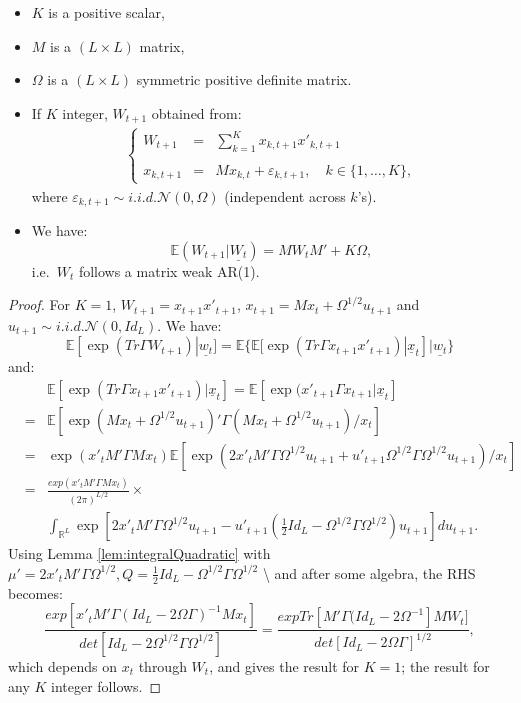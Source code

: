 \documentclass[
  12pt,
]{book}
\theoremstyle{definition}
\theoremstyle{definition}
\theoremstyle{definition}
\theoremstyle{definition}
\theoremstyle{remark}
\begin{document}
\begin{itemize}
\item
  \(K\) is a positive scalar,
\item
  \(M\) is a \((L \times L)\) matrix,
\item
  \(\Omega\) is a \((L \times L)\) symmetric positive definite matrix.
\item
  If \(K\) integer, \(W_{t+1}\) obtained from:
  \begin{eqnarray*}
  \left\{
  \begin{array}{ccl}
  W_{t+1} & =&  \sum^K_{k=1} x_{k,t+1} x'_{k,t+1}\\
  &&\\
  x_{k,t+1} & =& M x_{k,t} + \varepsilon_{k,t+1},\quad k \in \{1,\dots,K\},
  \end{array}
  \right.
  \end{eqnarray*}
  where \(\varepsilon_{k,t+1} \sim i.i.d. \mathcal{N}(0, \Omega)\) (independent across \(k\)'s).
\item
  We have:
  \[
  \mathbb{E}(W_{t+1}|\underline{W_t}) = MW_tM'+K \Omega,
  \]
  i.e.~\(W_t\) follows a matrix weak AR(1).
\end{itemize}

\begin{proof}
For \(K=1\), \(W_{t+1}=x_{t+1} x'_{t+1}\), \(x_{t+1} = M x_t + \Omega^{1/2} u_{t+1}\) and \(u_{t+1} \sim i.i.d. \mathcal{N}(0,Id_L)\). We have:
\[
\mathbb{E}[\exp(Tr \Gamma W_{t+1})|\underline{w_t}] = \mathbb{E}\{\mathbb{E}[\exp(Tr \Gamma x_{t+1} x'_{t+1})|\underline{x}_t]|\underline{w_t}\}
\]
and:
\begin{eqnarray*}
&& \mathbb{E}[\exp(Tr \Gamma x_{t+1}x'_{t+1})|\underline{x}_t] = \mathbb{E}[\exp(x'_{t+1}\Gamma x_{t+1}|\underline{x}_t] \\
&=& \mathbb{E}[\exp(M x_t + \Omega^{1/2} u_{t+1})'\Gamma(M x_t + \Omega^{1/2} u_{t+1})/x_t] \\
&=& \exp(x'_tM'\Gamma M x_t)\mathbb{E}[\exp(2 x'_t M'\Gamma \Omega^{1/2}
u_{t+1}+u'_{t+1}\Omega^{1/2} \Gamma \Omega^{1/2} u_{t+1})/x_t] \\
&=&  \frac{exp(x'_tM'\Gamma M x_t)}{(2\pi)^{L/2}} \times \\
&& \int_{\mathbb{R}^L} \exp\left[2x'_tM'\Gamma
\Omega^{1/2}u_{t+1}-u'_{t+1}\left(
\frac{1}{2} Id_L-\Omega^{1/2} \Gamma \Omega^{1/2}\right)u_{t+1}\right]  du_{t+1}.
\end{eqnarray*}
Using Lemma \ref{lem:integralQuadratic} with \(\mu' = 2 x'_t M'\Gamma \Omega^{1/2}, Q =  \frac{1}{2} Id_L-\Omega^{1/2}\Gamma\Omega^{1/2}\) \textbackslash{}
and after some algebra, the RHS becomes:
\[
 \frac{exp[x'_tM'\Gamma(Id_L-2\Omega\Gamma)^{-1}M
x_t]}{det[Id_L-2\Omega^{1/2}\Gamma\Omega^{1/2}]} =  \frac{exp Tr[M'\Gamma(Id_L-2\Omega^{-1}]M
W_t]}{det[Id_L-2\Omega \Gamma]^{1/2}},
\]
which depends on \(x_t\) through \(W_t\), and gives the result for
\(K=1\); the result for any \(K\) integer follows.
\end{proof}
\end{document}
